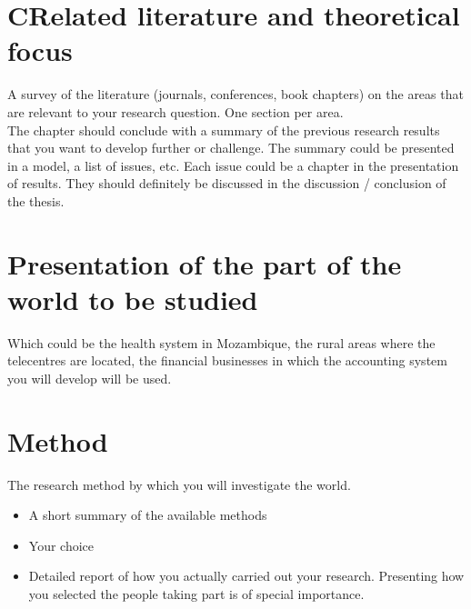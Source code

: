 \chapter{CRelated literature and theoretical focus}
  A survey of the literature (journals, conferences, book chapters) on the areas that are relevant 
    to your research question. One section per area. \\
  The chapter should conclude with a summary of the previous research results that you want to 
    develop further or challenge. The summary could be presented in a model, a list of issues, etc. 
    Each issue could be a chapter in the presentation of results. They should definitely be 
    discussed in the discussion / conclusion of the thesis. 

\chapter{Presentation of the part of the world to be studied}
  Which could be the health system in Mozambique, the rural areas where the telecentres are located, 
    the financial businesses in which the accounting system you will develop will be used. 

\chapter{Method}
  The research method by which you will investigate the world.
  \begin{itemize} 
    \item A short summary of the available methods
    \item Your choice
    \item Detailed report of how you actually carried out your research. Presenting how you selected 
      the people taking part is of special importance.
  \end{itemize}
  
